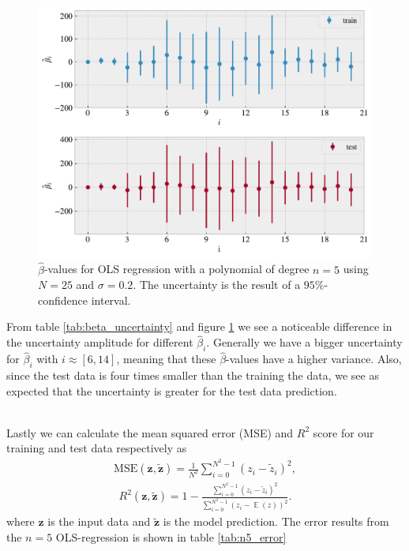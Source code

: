 \documentclass[norsk,a4paper,12pt]{scrartcl}
\DeclareMathOperator*{\E}{\mathbb{E}}
\renewcommand{\vec}[1]{\mathbf{#1}} %
\begin{document}
\begin{figure}[H]
    \centering
    \includegraphics[width=\linewidth]{figures/confidence_interval.pdf}
    \caption{$\hat{\beta}$-values for OLS regression with a polynomial of degree $n=5$ using $N = 25$ and $\sigma = 0.2$. The uncertainty is the result of a $95\%$-confidence interval.}
    \label{fig:beta_uncertainty}
\end{figure}
From table \ref{tab:beta_uncertainty} and figure \ref{fig:beta_uncertainty} we see a noticeable difference in the uncertainty amplitude for different $\hat{\beta}_i$. Generally we have a bigger uncertainty for $\hat{\beta}_i$ with $i \approx [6,14]$, meaning that these $\hat{\beta}$-values have a higher variance. Also, since the test data is four times smaller than the training the data, we see as expected that the uncertainty is greater for the test data prediction. \par
\\
Lastly we can calculate the mean squared error (MSE) and $R^2$ score for our training and test data respectively as 
\begin{align*}
    \text{MSE}(\vec{z}, \vec{\tilde{z}})=\frac{1}{N^2} \sum_{i=0}^{N^2-1}\left(z_{i}-\tilde{z}_{i}\right)^{2},
\end{align*}
\begin{align*}
    R^{2}(\vec{z}, \vec{\tilde{z}})=1-\frac{\sum_{i=0}^{N^2-1}\left(z_{i}-\tilde{z}_{i}\right)^{2}}{\sum_{i=0}^{N^2-1}\left(z_{i}-\E(z)\right)^{2}}.
\end{align*}
where $\vec{z}$ is the input data and $\vec{\tilde{z}}$ is the model prediction. The error results from the $n=5$ OLS-regression is shown in table \ref{tab:n5_error}
\end{document}
